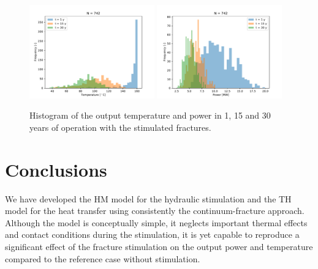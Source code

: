 \documentclass{article}
\begin{document}



\begin{figure}
\includegraphics[width=0.48\textwidth]{mlmc_random_frac/output_scenarios/output_por_disp_02/temp_histogram.pdf}
\includegraphics[width=0.48\textwidth]{mlmc_random_frac/output_scenarios/output_por_disp_02/power_histogram.pdf}
\caption{Histogram of the output temperature and power in 1, 15 and 30 years of operation with the stimulated fractures.}
\label{fig:histogrms}
\end{figure}

\section{Conclusions}
We have developed the HM model for the hydraulic stimulation and the TH model for the heat transfer using consistently the continuum-fracture approach. Although the model is conceptually simple, it neglects important thermal effects and contact conditions during the stimulation, it is yet capable to reproduce a significant effect of the fracture stimulation on the output power and temperature compared to the reference case without stimulation. 
\end{document}
